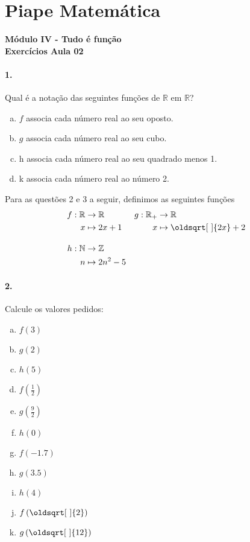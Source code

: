 \documentclass[a4paper,12pt]{article}
\renewcommand*{\sqrt}[2][\ ]{\oldsqrt[#1]{#2}}
\begin{document}
 
  
\section*{Piape Matemática} 
\textbf{Módulo IV - Tudo é função}\\
\textbf{Exercícios Aula 02}         
\begin{multicols}{2}
\paragraph*{1.}  
Qual é a notação das seguintes funções de $\mathbb{R}$ em $\mathbb{R}$?
\begin{enumerate}[a)] 
    \item $f$ associa cada número real ao seu oposto.
    \item $g$ associa cada número real ao seu cubo.
    \item h associa cada número real ao seu quadrado menos 1.
    \item k associa cada número real ao número 2.
\end{enumerate}

Para as questões 2 e 3 a seguir, definimos as seguintes funções
$$
\begin{aligned} 
f:\mathbb{R} &\to \mathbb{R} & g:\mathbb{R}_{+} & \to \mathbb{R} \\
x &\mapsto 2x + 1 & x&\mapsto \sqrt{2x} + 2\\[1em]
h: \mathbb{N} &\to \mathbb{Z} &   &  \\
n &\mapsto 2n^2 - 5 &   &  \\
\end{aligned}
$$
\paragraph*{2.} Calcule os valores pedidos:
\begin{multicols*}{2}
    \begin{enumerate}[a)]
        \item $f(3)$ %
        \item $g(2)$ %
        \item $h(5)$ %
        \item $f\left(\frac{1}{2}\right)$ %
        \item $g\left(\frac{9}{2}\right)$ %
        \item $h(0)$ %
        \item $f(-1.7)$ %
        \item $g(3.5)$ %
        \item $h(4)$ %
        \item $f\left(\sqrt{2}\right)$ %
        \item $g\left(\sqrt{12}\right)$ %
    \end{enumerate}
    

\end{multicols*}
\end{multicols}
\end{document}
